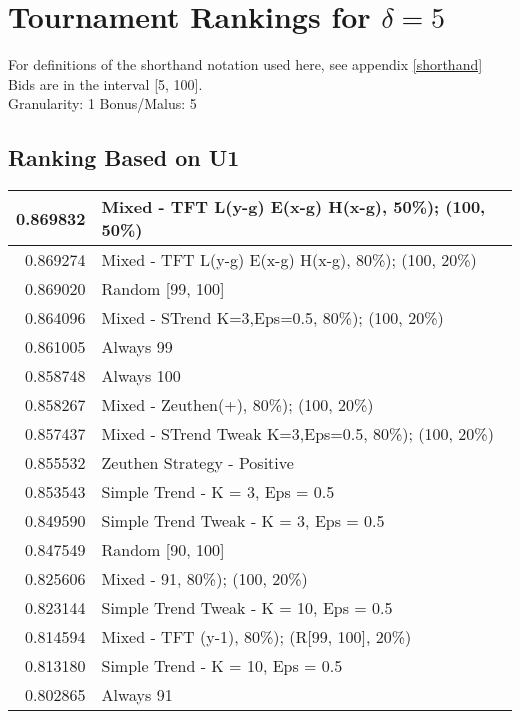 \newpage  
\section{Tournament Rankings for $\delta = 5$}\label{results_5}
For definitions of the shorthand notation used here, see appendix \ref{shorthand} \\
\newline
Bids are in the interval [5, 100].\\
Granularity: 1\hspace{0.25in} Bonus/Malus: 5\\
\begin{table}[!hbtp]
\subsection{Ranking Based on U1}
\begin{footnotesize}
\begin{tabular}{|r|l|}\hline  \label{U3results}
0.869832 & Mixed - {TFT L(y-g) E(x-g) H(x-g), 50\%); (100, 50\%)}\\ \hline
0.869274 & Mixed - {TFT L(y-g) E(x-g) H(x-g), 80\%); (100, 20\%)}\\ \hline
0.869020 & Random [99, 100]\\ \hline
0.864096 & Mixed - {STrend K=3,Eps=0.5, 80\%); (100, 20\%)}\\ \hline
0.861005 & Always 99\\ \hline
0.858748 & Always 100\\ \hline
0.858267 & Mixed - {Zeuthen(+), 80\%); (100, 20\%)}\\ \hline
0.857437 & Mixed - {STrend Tweak K=3,Eps=0.5, 80\%); (100, 20\%)}\\ \hline
0.855532 & Zeuthen Strategy - Positive\\ \hline
0.853543 & Simple Trend - K = 3, Eps = 0.5\\ \hline
0.849590 & Simple Trend Tweak - K = 3, Eps = 0.5\\ \hline
0.847549 & Random [90, 100]\\ \hline
0.825606 & Mixed - {91, 80\%); (100, 20\%)}\\ \hline
0.823144 & Simple Trend Tweak - K = 10, Eps = 0.5\\ \hline
0.814594 & Mixed - {TFT (y-1), 80\%); (R[99, 100], 20\%)}\\ \hline
0.813180 & Simple Trend - K = 10, Eps = 0.5\\ \hline
0.802865 & Always 91\\ \hline

\end{tabular}
\end{footnotesize}
\end{table}
